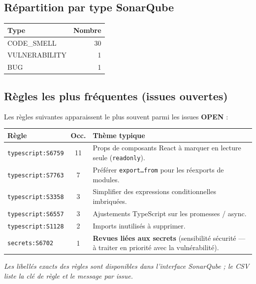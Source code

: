 \documentclass[11pt,a4paper]{article}
\begin{document}
\subsection{Répartition par type SonarQube}

\begin{table}[h]
  \centering
  \begin{tabular}{@{}lr@{}}
    \toprule
    \textbf{Type} & \textbf{Nombre} \\
    \midrule
    CODE\_SMELL & 30 \\
    VULNERABILITY & 1 \\
    BUG & 1 \\
    \bottomrule
  \end{tabular}
\end{table}

\subsection{Règles les plus fréquentes (issues ouvertes)}

Les règles suivantes apparaissent le plus souvent parmi les issues \textbf{OPEN} :

\begin{table}[h]
  \centering
  \small
  \begin{tabular}{@{}p{3.2cm}cp{7.5cm}@{}}
    \toprule
    \textbf{Règle} & \textbf{Occ.} & \textbf{Thème typique} \\
    \midrule
    \texttt{typescript:S6759} & 11 & Props de composants React à marquer en lecture seule (\texttt{readonly}). \\
    \texttt{typescript:S7763} & 7 & Préférer \texttt{export\ldots from} pour les réexports de modules. \\
    \texttt{typescript:S3358} & 3 & Simplifier des expressions conditionnelles imbriquées. \\
    \texttt{typescript:S6557} & 3 & Ajustements TypeScript sur les promesses / async. \\
    \texttt{typescript:S1128} & 2 & Imports inutilisés à supprimer. \\
    \texttt{secrets:S6702} & 1 & \textbf{Revues liées aux secrets} (sensibilité sécurité --- à traiter en priorité avec la vulnérabilité). \\
    \bottomrule
  \end{tabular}
\end{table}

\textit{Les libellés exacts des règles sont disponibles dans l'interface SonarQube ; le CSV liste la clé de règle et le message par issue.}
\end{document}
